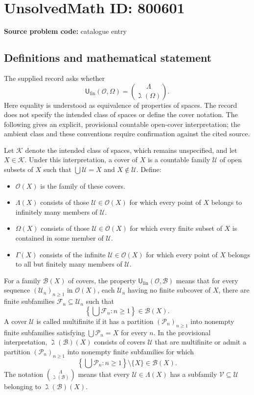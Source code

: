 \documentclass[11pt]{article}
\begin{document}
\section*{UnsolvedMath ID: 800601}
\textbf{Source problem code:} catalogue entry
\subsection{Definitions and mathematical statement}
The supplied record asks whether
\[
\mathsf{U}_{\mathrm{fin}}(\mathcal O,\Omega)
=\binom{\Lambda}{\gimel(\Omega)}.
\]
Here equality is understood as equivalence of properties of spaces. The record does not specify the intended class of spaces or define the cover notation. The following gives an explicit, provisional countable open-cover interpretation; the ambient class and these conventions require confirmation against the cited source.

Let \(\mathscr K\) denote the intended class of spaces, which remains unspecified, and let \(X\in\mathscr K\). Under this interpretation, a cover of \(X\) is a countable family \(\mathcal U\) of open subsets of \(X\) such that \(\bigcup\mathcal U=X\) and \(X\notin\mathcal U\). Define:
\begin{itemize}
\item \(\mathcal O(X)\) is the family of these covers.
\item \(\Lambda(X)\) consists of those \(\mathcal U\in\mathcal O(X)\) for which every point of \(X\) belongs to infinitely many members of \(\mathcal U\).
\item \(\Omega(X)\) consists of those \(\mathcal U\in\mathcal O(X)\) for which every finite subset of \(X\) is contained in some member of \(\mathcal U\).
\item \(\Gamma(X)\) consists of the infinite \(\mathcal U\in\mathcal O(X)\) for which every point of \(X\) belongs to all but finitely many members of \(\mathcal U\).
\end{itemize}
For a family \(\mathscr B(X)\) of covers, the property \(\mathsf U_{\mathrm{fin}}(\mathcal O,\mathscr B)\) means that for every sequence \((\mathcal U_n)_{n\geq1}\) in \(\mathcal O(X)\), each \(\mathcal U_n\) having no finite subcover of \(X\), there are finite subfamilies \(\mathcal F_n\subseteq\mathcal U_n\) such that
\[
\left\{\bigcup\mathcal F_n:n\geq1\right\}\in\mathscr B(X).
\]
A cover \(\mathcal U\) is called multifinite if it has a partition \((\mathcal P_n)_{n\geq1}\) into nonempty finite subfamilies satisfying \(\bigcup\mathcal P_n=X\) for every \(n\). In the provisional interpretation, \(\gimel(\mathscr B)(X)\) consists of covers \(\mathcal U\) that are multifinite or admit a partition \((\mathcal P_n)_{n\geq1}\) into nonempty finite subfamilies for which
\[
\left\{\bigcup\mathcal P_n:n\geq1\right\}\setminus\{X\}
\in\mathscr B(X).
\]
The notation \(\binom{\Lambda}{\gimel(\mathscr B)}\) means that every \(\mathcal U\in\Lambda(X)\) has a subfamily \(\mathcal V\subseteq\mathcal U\) belonging to \(\gimel(\mathscr B)(X)\).
\end{document}

